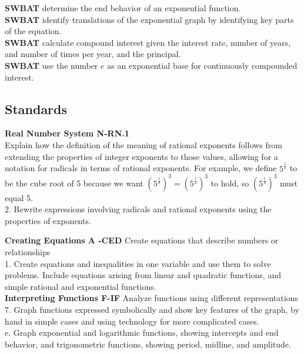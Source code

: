 \documentclass[12pt]{article}
\begin{document}
\textbf{SWBAT} determine the end behavior of an exponential function.\\

\textbf{SWBAT} identify translations of the exponential graph by identifying key parts of the equation.\\

\textbf{SWBAT} calculate compound interest given the interest rate, number of years, and number of times per year, and the principal.\\

\textbf{SWBAT} use the number $e$ as an exponential base for continuously compounded interest.\\
	


\subsection{Standards}
	\textbf{Real Number System \hfill N-RN.1}\\
	
	 Explain how the definition of the meaning of rational exponents follows from extending the properties of integer exponents to those values, allowing for a notation for radicals in terms of rational exponents. For example, we define $5^{\frac{1}{3}}$ to be the cube root of 5 because we want $\left(5^{\frac{1}{3}}\right)^{3} =\left(5^{\frac{1}{3}}\right)^{3}$ to hold, so $\left(5^{\frac{1}{3}}\right)^{3}$ must equal 5. \\
	
2.	 Rewrite expressions involving radicals and rational exponents using the properties of exponents.
	

\textbf{Creating Equations A -CED} Create equations that describe numbers or relationships\\

1. Create equations and inequalities in one variable and use them to solve problems. Include equations arising from linear and quadratic functions, and simple rational and exponential functions.\\

\textbf{Interpreting Functions F-IF} Analyze functions using different representations \\

7. Graph functions expressed symbolically and show key features of the graph, by hand in simple cases and using technology for more complicated cases.\\

e. Graph exponential and logarithmic functions, showing intercepts and end behavior, and trigonometric functions, showing period, midline, and amplitude.\\
\end{document}

